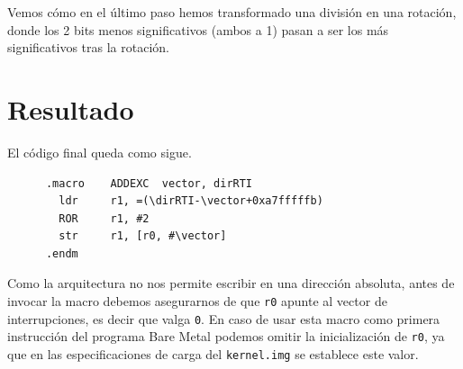 Vemos cómo en el último paso hemos transformado una división en una rotación, donde los
2 bits menos significativos (ambos a 1) pasan a ser los más significativos tras la
rotación.

\section{Resultado}

El código final queda como sigue.

\begin{lstlisting}
      .macro    ADDEXC  vector, dirRTI
        ldr     r1, =(\dirRTI-\vector+0xa7fffffb)
        ROR     r1, #2
        str     r1, [r0, #\vector]
      .endm
\end{lstlisting}

Como la arquitectura no nos permite escribir en una dirección absoluta, antes
de invocar la macro debemos asegurarnos de que {\tt r0} apunte al vector de
interrupciones, es decir que valga {\tt 0}. En caso de usar esta macro como
primera instrucción del programa Bare Metal podemos omitir la inicialización
de {\tt r0}, ya que en las especificaciones de carga del {\tt kernel.img} se
establece este valor.

\chapterend
